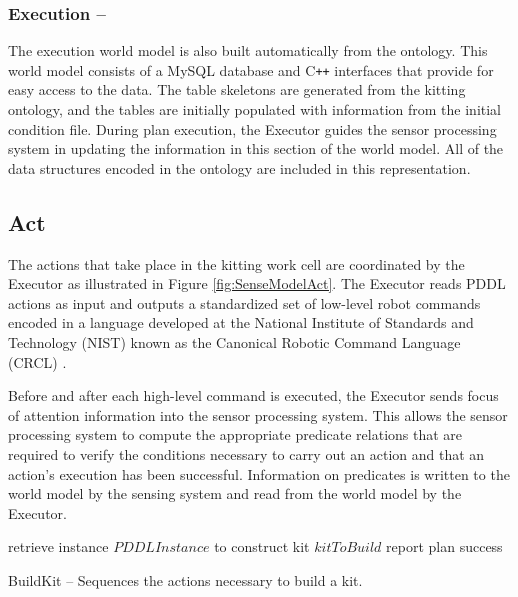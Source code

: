 \subsubsection{Execution --}
The execution world model is also built automatically from the ontology. This world model consists of a MySQL database and C\texttt{++} 
interfaces that provide for easy access to the data. The table skeletons are generated from the kitting ontology, and the tables are initially populated
with information from the initial condition file. During plan execution, the Executor guides the sensor processing system
in updating the information in 
this section of the world model. All of the data structures encoded in the ontology are included in this representation. 
%
\subsection{Act}
\label{subsection:Act}
The actions that take place in the kitting work cell are coordinated by the Executor as illustrated in Figure \ref{fig:SenseModelAct}.  The Executor
reads PDDL actions as input and outputs a standardized set of low-level robot commands encoded in a language developed at the National Institute of Standards
and Technology (NIST) known as the  Canonical Robotic Command Language (CRCL) \cite{Balakirsky2012-1}. 

Before and after each high-level command
is executed, the Executor sends focus of attention information into the sensor processing system. This allows the sensor processing system to compute
the appropriate predicate relations that are required to verify the conditions necessary to carry out an action and that an action's execution has
been successful. Information on predicates is written to the world model by the sensing system and read from the world model by the Executor.
%
\\
\begin{algorithm}[h!]

 	retrieve instance $PDDLInstance$ to construct kit $kitToBuild$\;
 	report plan success\;
\caption{{\sc BuildKit} -- Sequences the actions necessary to build a kit.}
\label{fig:buildkit}
\end{algorithm}
%